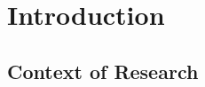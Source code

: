 \setcounter{chapter}{0}
\chapter{Introduction}\label{sec:intro}

\section{Context of Research}\label{sec:motivation}

